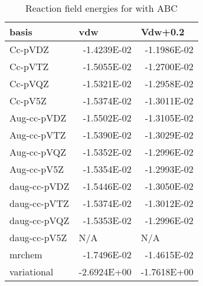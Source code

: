 \documentclass[../master_thesis.tex]{subfiles}
\begin{document}
\begin{table}[htbp]
\caption{Reaction field  energies for  with \ac{ABC}}
\begin{tabular}{|l|r|r|}
\hline
basis & \multicolumn{1}{l|}{vdw} & \multicolumn{1}{l|}{Vdw+0.2} \\ \hline
Cc-pVDZ & -1.4239E-02 & -1.1986E-02 \\ \hline
Cc-pVTZ & -1.5055E-02 & -1.2700E-02 \\ \hline
Cc-pVQZ & -1.5321E-02 & -1.2958E-02 \\ \hline
Cc-pV5Z & -1.5374E-02 & -1.3011E-02 \\ \hline
Aug-cc-pVDZ & -1.5502E-02 & -1.3105E-02 \\ \hline
Aug-cc-pVTZ & -1.5390E-02 & -1.3029E-02 \\ \hline
Aug-cc-pVQZ & -1.5352E-02 & -1.2996E-02 \\ \hline
Aug-cc-pV5Z & -1.5354E-02 & -1.2993E-02 \\ \hline
daug-cc-pVDZ & -1.5446E-02 & -1.3050E-02 \\ \hline
daug-cc-pVTZ & -1.5374E-02 & -1.3012E-02 \\ \hline
daug-cc-pVQZ & -1.5353E-02 & -1.2996E-02 \\ \hline
daug-cc-pV5Z & \multicolumn{1}{l|}{N/A} & \multicolumn{1}{l|}{N/A} \\ \hline
mrchem & -1.7496E-02 & -1.4615E-02 \\ \hline
variational & -2.6924E+00 & -1.7618E+00 \\ \hline
\end{tabular}
\label{tab:abcEracetamid}
\end{table}

\biblio
\end{document}
